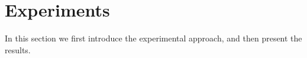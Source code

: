 \documentclass[conference]{IEEEtran}
\def\phi{\varphi}
\begin{document}
\fi















\section{Experiments}\label{sec:exp}

In this section we first introduce the experimental approach, and then 
present the results.  

\iffalse
\begin{figure}[t]
\begin{minipage}[b]{0.45\linewidth}
\centering
\texttt{[image: Qformulas]}
\caption{Experimental results on Q pattern formulas ($\phi=\bigwedge_{1\leq i\leq n} (Fa_i\vee Ga_{i+1})$).}
\label{fig:Qformulas}
\vspace{0.3cm}
\end{minipage}
\hspace{0.6cm}
\begin{minipage}[b]{0.45\linewidth}
\centering
\texttt{[image: O2formulas]}
\caption{Experimental results on O2 pattern formulas ($\phi = \bigwedge_{1\leq i\leq n-1}FG(a_i\leftrightarrow a_{i+1}) \wedge FG(a_n\leftrightarrow \neg a_1)$).}
\label{fig:O2formulas}

\end{minipage}
\end{figure}
\fi
\end{document}

